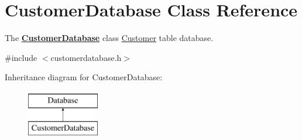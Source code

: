 \hypertarget{classCustomerDatabase}{\section{Customer\+Database Class Reference}
\label{classCustomerDatabase}
}


The {\bfseries \hyperlink{classCustomerDatabase}{Customer\+Database}} class \hyperlink{classCustomer}{Customer} table database.  




{\ttfamily \#include $<$customerdatabase.\+h$>$}

Inheritance diagram for Customer\+Database\+:\begin{figure}[H]
\begin{center}
\leavevmode
\includegraphics[height=2.000000cm]{dc/d7c/classCustomerDatabase}
\end{center}
\end{figure}
